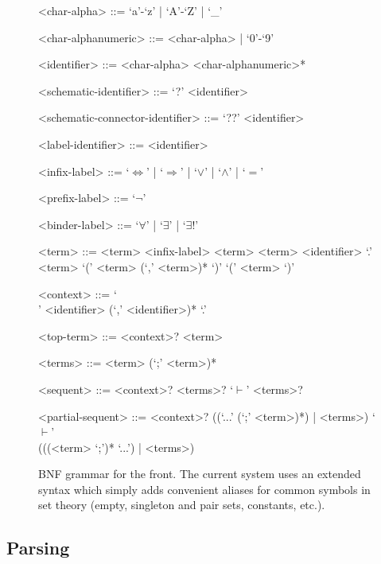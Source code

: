 \begin{figure}[H]
  \centering
  \begin{framed}
  \begin{grammar}
  <char-alpha> ::= `a'-`z' | `A'-`Z' | `_'
  
  <char-alphanumeric> ::= <char-alpha> | `0'-`9'
  
  <identifier> ::= <char-alpha> <char-alphanumeric>*
  
  <schematic-identifier> ::= `?' <identifier>
  
  <schematic-connector-identifier> ::= `??' <identifier>
  
  <label-identifier> ::= <identifier>
  
  <infix-label> ::= `\(\Leftrightarrow\)' | `\(\Rightarrow\)' | `\(\lor\)' | `\(\land\)' | `\(=\)'
  
  <prefix-label> ::= `\(\neg\)'
  
  <binder-label> ::= `\(\forall\)' | `\(\exists\)' | `\(\exists!\)'
  
  <term> ::= <term> <infix-label> <term>
   <term>
   <identifier> `.' <term>
   `(' <term> (`,' <term>)* `)'
  \alt `(' <term> `)'
  
  <context> ::= `\\' <identifier> (`,' <identifier>)* `.'
  
  <top-term> ::= <context>? <term>
  
  <terms> ::= <term> (`;' <term>)*
  
  <sequent> ::= <context>? <terms>? `\(\vdash\)' <terms>?
  
  <partial-sequent> ::= <context>? ((`...' (`;' <term>)*) | <terms>) `\(\vdash\)' \\
  (((<term> `;')* `...') | <terms>)
  \end{grammar}
  \end{framed}
  \caption[BNF grammar]{BNF grammar for the front. The current system uses an extended syntax which simply adds convenient aliases for common symbols in set theory (empty, singleton and pair sets, constants, etc.).}
  \label{fig:grammar}
\end{figure}

\subsection{Parsing}

